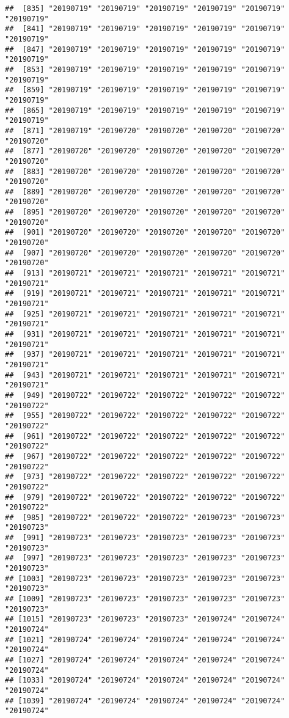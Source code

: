 \documentclass[]{article}
\begin{document}
\begin{verbatim}
##  [835] "20190719" "20190719" "20190719" "20190719" "20190719" "20190719"
##  [841] "20190719" "20190719" "20190719" "20190719" "20190719" "20190719"
##  [847] "20190719" "20190719" "20190719" "20190719" "20190719" "20190719"
##  [853] "20190719" "20190719" "20190719" "20190719" "20190719" "20190719"
##  [859] "20190719" "20190719" "20190719" "20190719" "20190719" "20190719"
##  [865] "20190719" "20190719" "20190719" "20190719" "20190719" "20190719"
##  [871] "20190719" "20190720" "20190720" "20190720" "20190720" "20190720"
##  [877] "20190720" "20190720" "20190720" "20190720" "20190720" "20190720"
##  [883] "20190720" "20190720" "20190720" "20190720" "20190720" "20190720"
##  [889] "20190720" "20190720" "20190720" "20190720" "20190720" "20190720"
##  [895] "20190720" "20190720" "20190720" "20190720" "20190720" "20190720"
##  [901] "20190720" "20190720" "20190720" "20190720" "20190720" "20190720"
##  [907] "20190720" "20190720" "20190720" "20190720" "20190720" "20190720"
##  [913] "20190721" "20190721" "20190721" "20190721" "20190721" "20190721"
##  [919] "20190721" "20190721" "20190721" "20190721" "20190721" "20190721"
##  [925] "20190721" "20190721" "20190721" "20190721" "20190721" "20190721"
##  [931] "20190721" "20190721" "20190721" "20190721" "20190721" "20190721"
##  [937] "20190721" "20190721" "20190721" "20190721" "20190721" "20190721"
##  [943] "20190721" "20190721" "20190721" "20190721" "20190721" "20190721"
##  [949] "20190722" "20190722" "20190722" "20190722" "20190722" "20190722"
##  [955] "20190722" "20190722" "20190722" "20190722" "20190722" "20190722"
##  [961] "20190722" "20190722" "20190722" "20190722" "20190722" "20190722"
##  [967] "20190722" "20190722" "20190722" "20190722" "20190722" "20190722"
##  [973] "20190722" "20190722" "20190722" "20190722" "20190722" "20190722"
##  [979] "20190722" "20190722" "20190722" "20190722" "20190722" "20190722"
##  [985] "20190722" "20190722" "20190722" "20190723" "20190723" "20190723"
##  [991] "20190723" "20190723" "20190723" "20190723" "20190723" "20190723"
##  [997] "20190723" "20190723" "20190723" "20190723" "20190723" "20190723"
## [1003] "20190723" "20190723" "20190723" "20190723" "20190723" "20190723"
## [1009] "20190723" "20190723" "20190723" "20190723" "20190723" "20190723"
## [1015] "20190723" "20190723" "20190723" "20190724" "20190724" "20190724"
## [1021] "20190724" "20190724" "20190724" "20190724" "20190724" "20190724"
## [1027] "20190724" "20190724" "20190724" "20190724" "20190724" "20190724"
## [1033] "20190724" "20190724" "20190724" "20190724" "20190724" "20190724"
## [1039] "20190724" "20190724" "20190724" "20190724" "20190724" "20190724"

\end{verbatim}
\end{document}

